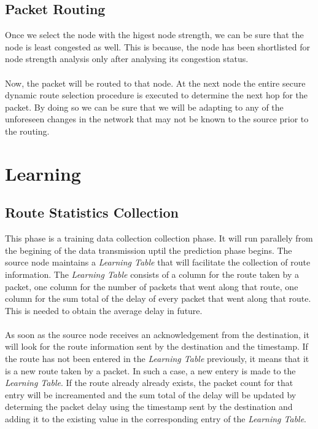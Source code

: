 \documentclass[journal]{IEEEtran}
\begin{document}
\subsection{Packet Routing}
Once we select the node with the higest node strength, we can be sure that the node is least congested as well. This is because, the node has been shortlisted for node strength analysis only after analysing its congestion status.\\ \\
\indent Now, the packet will be routed to that node. At the next node the entire secure dynamic route selection procedure is executed to determine the next hop for the packet. By doing so we can be sure that we will be adapting to any of the unforeseen changes in the network that may not be known to the source prior to the routing.

\section{Learning}
\subsection{Route Statistics Collection}
This phase is a training data collection collection phase. It will run parallely from the begining of the data transmission uptil the prediction phase begins. The source node maintains a \textit{Learning Table} that will facilitate the collection of route information. The \textit{Learning Table} consists of a column for the route taken by a packet, one column for the number of packets that went along that route, one column for the sum total of the delay of every packet that went along that route. This is needed to obtain the average delay in future. \\ \\
\indent As soon as  the source node receives an acknowledgement from the destination, it will look for the route information sent by the destination and the timestamp. If the route has not been entered in the \textit{Learning Table} previously, it means that it is a new route taken by a packet. In such a case, a new entery is made to the \textit{Learning Table}. If the route already already exists, the packet count for that entry will be increamented and the sum total of the delay will be updated by determing the packet delay using the timestamp sent by the destination and adding it to the existing value in the corresponding entry of the \textit{Learning Table}. 
\end{document}
